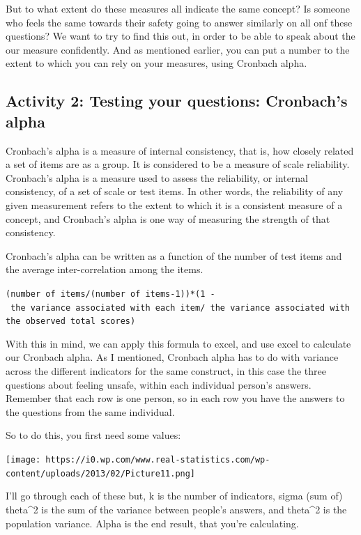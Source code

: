 \documentclass[]{book}
\theoremstyle{definition}
\theoremstyle{definition}
\theoremstyle{definition}
\theoremstyle{remark}
\begin{document}
But to what extent do these measures all indicate the same concept? Is
someone who feels the same towards their safety going to answer
similarly on all onf these questions? We want to try to find this out,
in order to be able to speak about the our measure confidently. And as
mentioned earlier, you can put a number to the extent to which you can
rely on your measures, using Cronbach alpha.

\hypertarget{activity-2-testing-your-questions-cronbachs-alpha}{%
\subsection{Activity 2: Testing your questions: Cronbach's
alpha}\label{activity-2-testing-your-questions-cronbachs-alpha}}

Cronbach's alpha is a measure of internal consistency, that is, how
closely related a set of items are as a group. It is considered to be a
measure of scale reliability. Cronbach's alpha is a measure used to
assess the reliability, or internal consistency, of a set of scale or
test items. In other words, the reliability of any given measurement
refers to the extent to which it is a consistent measure of a concept,
and Cronbach's alpha is one way of measuring the strength of that
consistency.

Cronbach's alpha can be written as a function of the number of test
items and the average inter-correlation among the items.

\texttt{(number\ of\ items/(number\ of\ items-1))*(1\ -\ the\ variance\ associated\ with\ each\ item/\ the\ variance\ associated\ with\ the\ observed\ total\ scores)}

 With this in mind, we can apply this formula to excel, and use excel to
calculate our Cronbach alpha. As I mentioned, Cronbach alpha has to do
with variance across the different indicators for the same construct, in
this case the three questions about feeling unsafe, within each
individual person's answers. Remember that each row is one person, so in
each row you have the answers to the questions from the same individual.

So to do this, you first need some values:

\texttt{[image: https://i0.wp.com/www.real-statistics.com/wp-content/uploads/2013/02/Picture11.png]}

I'll go through each of these but, k is the number of indicators, sigma
(sum of) theta\^{}2 is the sum of the variance between people's answers,
and theta\^{}2 is the population variance. Alpha is the end result, that
you're calculating.
\end{document}
